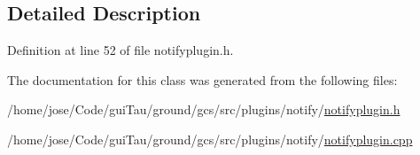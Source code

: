 \subsection{Detailed Description}


Definition at line 52 of file notifyplugin.\-h.



The documentation for this class was generated from the following files\-:\begin{DoxyCompactItemize}
\item 
/home/jose/\-Code/gui\-Tau/ground/gcs/src/plugins/notify/\hyperlink{notifyplugin_8h}{notifyplugin.\-h}\item 
/home/jose/\-Code/gui\-Tau/ground/gcs/src/plugins/notify/\hyperlink{notifyplugin_8cpp}{notifyplugin.\-cpp}\end{DoxyCompactItemize}
